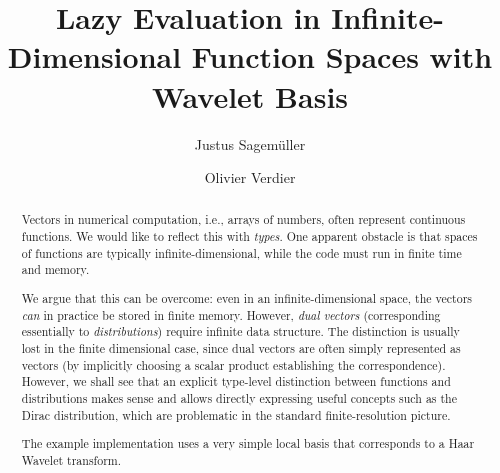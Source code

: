 \documentclass[sigplan,screen]{acmart}
\theoremstyle{acmplain}
\theoremstyle{acmdefinition}
\begin{document}
\title[Lazy Infinite Wavelet Expansion]
      {Lazy Evaluation in Infinite-Dimensional Function Spaces with Wavelet Basis}


\author{Justus Sagemüller}

\author{Olivier Verdier}


\begin{abstract}
Vectors in numerical computation, i.e., arrays of numbers, often represent continuous functions.
We would like to reflect this with \emph{types}.
One apparent obstacle is that spaces of functions are typically infinite-dimensional,
while the code must run in finite time and memory.

We argue that this can be overcome: even in an infinite-dimensional space, the vectors \emph{can} in practice be stored in finite memory.
However, \emph{dual vectors} (corresponding essentially to \emph{distributions}) require infinite data structure.
The distinction is usually lost in the finite dimensional case, since dual vectors are often simply represented as vectors (by implicitly choosing a scalar product establishing the correspondence).
However, we shall see that an explicit type-level distinction between functions and distributions makes sense and allows directly expressing useful concepts such as the Dirac distribution, which are problematic in the standard finite-resolution picture.

The example implementation uses a very simple local basis that corresponds to a Haar Wavelet transform.
\end{abstract}
\end{document}
